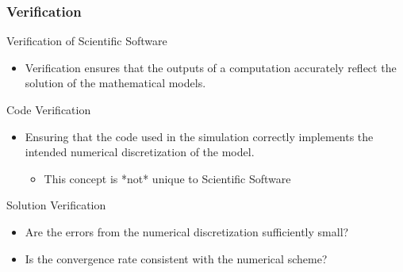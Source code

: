 \documentclass[mathserif]{beamer}
\begin{document}

\begin{frame}
  \frametitle{Verification}

  \begin{block}{Verification of Scientific Software}
    \begin{itemize}
    \item Verification ensures that the outputs of a computation accurately reflect the solution of the mathematical models.
    \end{itemize}
  \end{block}

  \begin{block}{Code Verification}
    \begin{itemize}
    \item Ensuring that the code used in the simulation correctly
	  implements the intended numerical discretization of the model.
	  \begin{itemize}
	   \item This concept is *not* unique to Scientific Software 
	  \end{itemize}
    \end{itemize}
  \end{block}

  \begin{block}{Solution Verification}
    \begin{itemize}
    \item Are the errors from the numerical discretization sufficiently small?
    \item Is the convergence rate consistent with the numerical scheme?
    \end{itemize}
  \end{block}
  
\end{frame}
\end{document}
